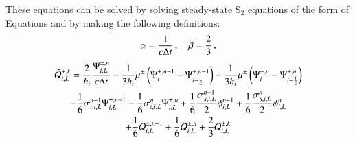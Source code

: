 \documentclass[preprint,12pt]{elsarticle}
\begin{document}
These equations can be solved by solving steady-state S$_2$ equations
of the form of Equations  and  by making
the following definitions:
\begin{equation}
  \alpha = \frac{1}{c\Delta t} \, , \quad \beta = \frac{2}{3} \, ,
\end{equation}
\begin{multline}
  \tilde{\mathcal{Q}}_{i,L}^{\pm,k}
  = \frac{2}{h_i}\frac{\Psi_{i,L}^{\pm,n}}{c\Delta t}
  - \frac{1}{3h_i}\mu^\pm\left( \Psi_i^{\pm,n-1} - \Psi_{i-\frac{1}{2}}^{\pm,n-1} \right)
  - \frac{1}{3h_i}\mu^\pm\left( \Psi_i^{\pm,n} - \Psi_{i-\frac{1}{2}}^{\pm,n} \right)\\
  - \frac{1}{6}\sigma_{t,i,L}^{n-1}\Psi_{i,L}^{\pm,n-1}
  - \frac{1}{6}\sigma_{t,i,L}^n    \Psi_{i,L}^{\pm,n}
  + \frac{1}{6}\frac{\sigma_{s,i,L}^{n-1}}{2}\phi_{i,L}^{n-1}
  + \frac{1}{6}\frac{\sigma_{s,i,L}^n}{2}    \phi_{i,L}^n\\
  + \frac{1}{6}\mathcal{Q}_{i,L}^{\pm,n-1}
  + \frac{1}{6}\mathcal{Q}_{i,L}^{\pm,n}
  + \frac{2}{3}\mathcal{Q}_{i,L}^{\pm,k}
\end{multline}
\end{document}
